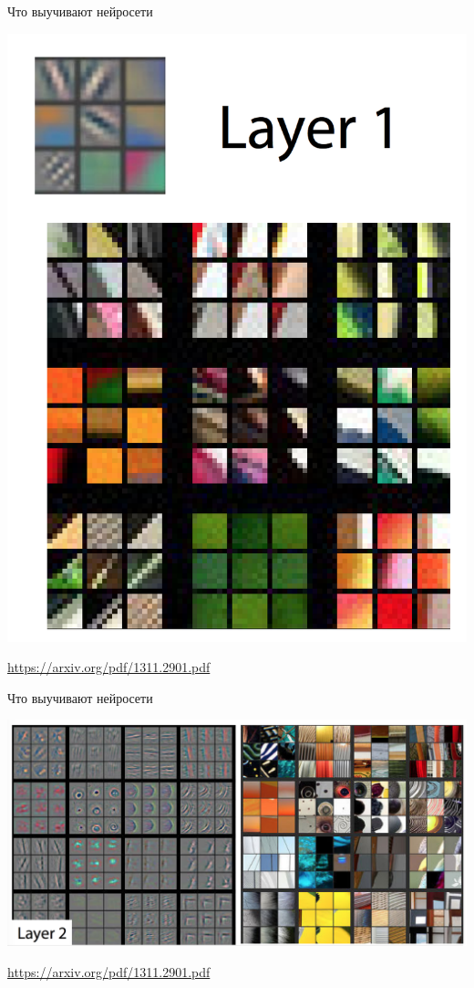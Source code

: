\documentclass[notes,12pt, aspectratio=169]{beamer}
\begin{document}
\begin{frame}{Что выучивают нейросети}
\begin{center}
	\includegraphics[width=0.3\paperwidth]{layer1.png}
\end{center}
\vfill
\footnotesize
{\color{blue} \url{https://arxiv.org/pdf/1311.2901.pdf}}
\end{frame}


\begin{frame}{Что выучивают нейросети}
\begin{center}
	\includegraphics[width=0.73\paperwidth]{layer_3.png}
\end{center}
\vfill
\footnotesize
{\color{blue} \url{https://arxiv.org/pdf/1311.2901.pdf}}
\end{frame}
\end{document}
